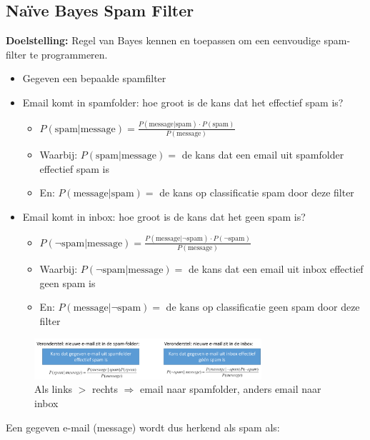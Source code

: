 \documentclass{article}
\begin{document}
\subsection{Naïve Bayes Spam Filter}

\textbf{Doelstelling:} Regel van Bayes kennen en toepassen om een eenvoudige spam-filter te programmeren.

\begin{itemize}
    \item Gegeven een bepaalde spamfilter
    \item Email komt in spamfolder: hoe groot is de kans dat het effectief spam is?
    \begin{itemize}
        \item $P(\text{spam} | \text{message}) = \frac{P(\text{message}|\text{spam}) \cdot P(\text{spam})}{P(\text{message})}$
        \item Waarbij: $P(\text{spam} | \text{message})=$ de kans dat een email uit spamfolder effectief spam is
        \item En: $P(\text{message}|\text{spam})=$ de kans op classificatie spam door deze filter
    \end{itemize}
    \item Email komt in inbox: hoe groot is de kans dat het geen spam is?
    \begin{itemize}
        \item $P(\neg \text{spam} | \text{message}) = \frac{P(\text{message}|\neg \text{spam}) \cdot P(\neg \text{spam})}{P(\text{message})}$
        \item Waarbij: $P(\neg \text{spam} | \text{message})=$ de kans dat een email uit inbox effectief geen spam is
        \item En: $P(\text{message}| \neg \text{spam})=$ de kans op classificatie geen spam door deze filter
    \end{itemize}
\end{itemize}

\begin{figure}[H]
    \centering
    \includegraphics[width=0.75\textwidth]{bayes-spam.png}
    \caption{Als links $>$ rechts $\Rightarrow$ email naar spamfolder, anders email naar inbox}
\end{figure}

Een gegeven e-mail (message) wordt dus herkend als spam als:
\end{document}
